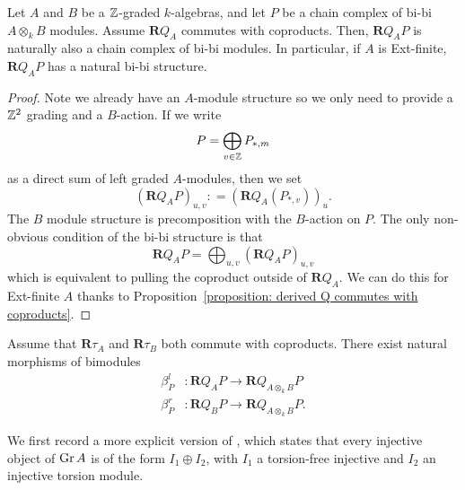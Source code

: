 \documentclass[dissertation.tex]{subfiles}
\begin{document}
\begin{corollary} \label{corollary: Q preserves bimodules}
  Let \(A\) and \(B\) be a \(\mathbb{Z}\)-graded \(k\)-algebras, and let \(P\) be a chain complex of bi-bi \(A \otimes_k B\) modules. Assume \(\mathbf{R}Q_A\) commutes with coproducts. Then, \(\mathbf{R}Q_A P\) is naturally also a chain complex of bi-bi modules. In particular, if \(A\) is Ext-finite, \(\mathbf{R}Q_A P\) has a natural bi-bi structure. 
\end{corollary}

\begin{proof}
  Note we already have an \(A\)-module structure so we only need to provide a \(\mathbb{Z}^2\) grading and a \(B\)-action. If we write 
  \begin{displaymath}
    P = \bigoplus_{v \in \mathbb{Z}} P_{\ast,m}
  \end{displaymath}
  as a direct sum of left graded \(A\)-modules, then we set 
  \begin{displaymath}
    (\mathbf{R}Q_A P)_{u,v} : = ( \mathbf{R} Q_A (P_{\ast,v}) )_u.
  \end{displaymath}
  The \(B\) module structure is precomposition with the \(B\)-action on \(P\). The only non-obvious condition of the bi-bi structure is that 
  \begin{displaymath}
    \mathbf{R}Q_A P = \bigoplus_{u,v} (\mathbf{R}Q_A P)_{u,v}
  \end{displaymath}
  which is equivalent to pulling the coproduct outside of \(\mathbf{R}Q_A\). We can do this for Ext-finite \(A\) thanks to Proposition~\ref{proposition: derived Q commutes with coproducts}. 
\end{proof}

\begin{corollary} \label{corollary: natural maps between Qs}
  Assume that \(\mathbf{R}\tau_A\) and \(\mathbf{R}\tau_B\) both commute with coproducts. There exist natural morphisms of bimodules 
  \begin{align*}
    \beta^l_P & : \mathbf{R}Q_{A} P \to \mathbf{R}Q_{A \otimes_k B} P \\
    \beta^r_P & : \mathbf{R}Q_{B} P \to \mathbf{R}Q_{A \otimes_k B} P.
  \end{align*}
\end{corollary}

We first record a more explicit version of \cite[Prop 7.1 (5)]{AZ}, which states that every injective object of \(\operatorname{Gr}A\) is of the form \(I_1 \oplus I_2\), with \(I_1\) a torsion-free injective and \(I_2\) an injective torsion module.
\end{document}
